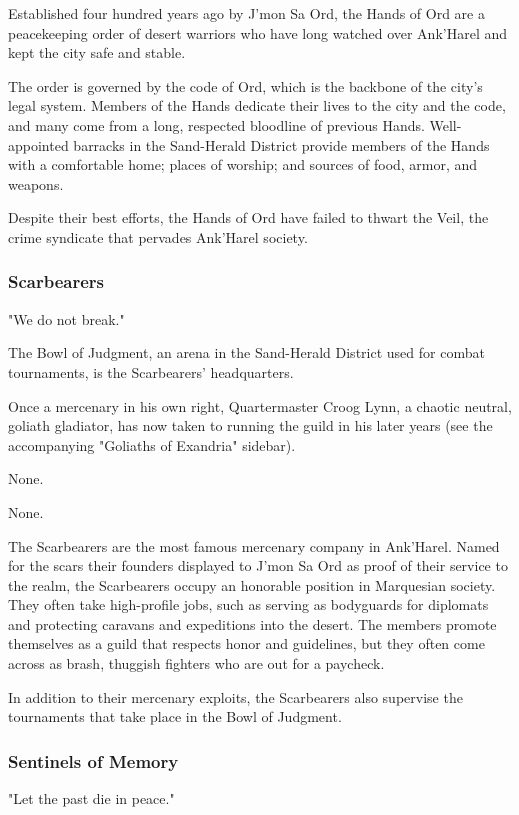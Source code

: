 \documentclass[10pt,a4paper,twoside,bg=print,twocolumn,openany,nodeprecatedcode]{dndbook}
\begin{document}
Established four hundred years ago by J'mon Sa Ord, the Hands of Ord are a peacekeeping order of desert warriors who have long watched over Ank'Harel and kept the city safe and stable.

The order is governed by the code of Ord, which is the backbone of the city's legal system. Members of the Hands dedicate their lives to the city and the code, and many come from a long, respected bloodline of previous Hands. Well-appointed barracks in the Sand-Herald District provide members of the Hands with a comfortable home; places of worship; and sources of food, armor, and weapons.

Despite their best efforts, the Hands of Ord have failed to thwart the Veil, the crime syndicate that pervades Ank'Harel society.

\subsubsection{Scarbearers}
"We do not break."


\begin{description}[nolistsep]
\item[Headquarters.]
The Bowl of Judgment, an arena in the Sand-Herald District used for combat tournaments, is the Scarbearers' headquarters.
\item[Leader.]
Once a mercenary in his own right, Quartermaster Croog Lynn, a chaotic neutral, goliath gladiator, has now taken to running the guild in his later years (see the accompanying "Goliaths of Exandria" sidebar).
\item[Allies.]
None.
\item[Opponents.]
None.
\end{description}

The Scarbearers are the most famous mercenary company in Ank'Harel. Named for the scars their founders displayed to J'mon Sa Ord as proof of their service to the realm, the Scarbearers occupy an honorable position in Marquesian society. They often take high-profile jobs, such as serving as bodyguards for diplomats and protecting caravans and expeditions into the desert. The members promote themselves as a guild that respects honor and guidelines, but they often come across as brash, thuggish fighters who are out for a paycheck.

In addition to their mercenary exploits, the Scarbearers also supervise the tournaments that take place in the Bowl of Judgment.

\subsubsection{Sentinels of Memory}
"Let the past die in peace."
\end{document}
